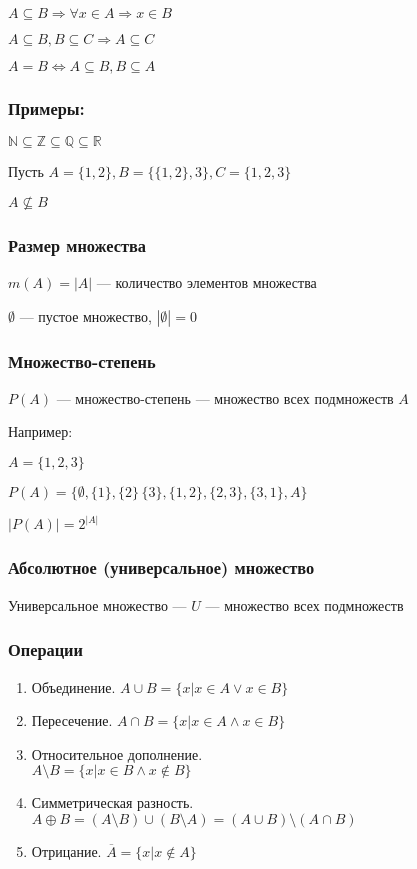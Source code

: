 \documentclass{article}
\begin{document}
$A \subseteq B \Rightarrow \forall x \in A \Rightarrow x \in B$

$A \subseteq B, B \subseteq C \Rightarrow A \subseteq C$

$A = B \Leftrightarrow A \subseteq B, B \subseteq A$

\subsubsection*{Примеры:}

$\mathbb{N} \subseteq \mathbb{Z} \subseteq \mathbb{Q} \subseteq \mathbb{R}$

Пусть $A = \{1, 2\}, B = \{\{1, 2\}, 3\}, C = \{1, 2, 3\}$

$A \not \subseteq B$

\subsubsection{Размер множества}

$m(A) = |A|$ --- количество элементов множества

$\emptyset$ --- пустое множество, $|\emptyset| = 0$

\subsubsection{Множество-степень}

$P(A)$ --- множество-степень --- множество всех подмножеств $A$

Например:

$A = \{1, 2, 3\}$

$P(A) = \{\emptyset, \{1\}, \{2\}\, \{3\}, \{1, 2\}, \{2, 3\}, \{3, 1\}, A\}$

$|P(A)| = 2^{|A|}$

\subsubsection{Абсолютное (универсальное) множество}

Универсальное множество --- $U$ --- множество всех подмножеств

\subsubsection{Операции}

\begin{enumerate}
	\item Объединение. $A \cup B = \{x | x \in A \lor x \in B\}$
	\item Пересечение. $A \cap B = \{x | x \in A \land x \in B\}$
	\item Относительное дополнение.\\
	$A \setminus B = \{x | x \in B \land x \not \in B\}$
	\item Симметрическая разность. $A \oplus B = (A \setminus B) \cup (B \setminus A) = (A \cup B) \setminus (A \cap B)$
	\item Отрицание. $\overline{A} = \{x | x \not \in A\}$
\end{enumerate}
\end{document}
